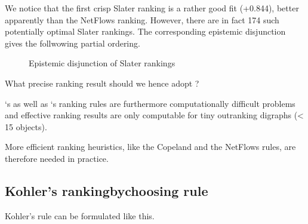 \documentclass[a4paper,10pt,english]{sphinxhowto}
\begin{document}
\begin{sphinxVerbatim}[commandchars=\\\{\},numbers=left,firstnumber=1,stepnumber=1]
\end{sphinxVerbatim}

We notice that the first crisp Slater ranking is a rather good fit (+0.844), better apparently than the Net\sphinxhyphen{}Flows ranking. However, there are in fact 174 such potentially optimal Slater rankings. The corresponding epistemic disjunction gives the follwowing partial ordering.

\begin{figure}[htbp]
\centering
\capstart

\noindent{}
\caption{Epistemic disjunction of Slater rankings}\label{\detokenize{tutorial:id122}}\end{figure}

What precise ranking result should we hence adopt ?

 ‘s as well as  ‘s ranking rules are furthermore computationally difficult problems and effective ranking results are only computable for tiny outranking digraphs (\textless{} 15 objects).

More efficient ranking heuristics, like the Copeland and the Net\sphinxhyphen{}Flows rules, are therefore needed in practice.


\subsection{Kohler’s ranking\sphinxhyphen{}by\sphinxhyphen{}choosing rule}
\label{\detokenize{tutorial:kohler-s-ranking-by-choosing-rule}}
Kohler’s  rule can be formulated like this.
\end{document}

